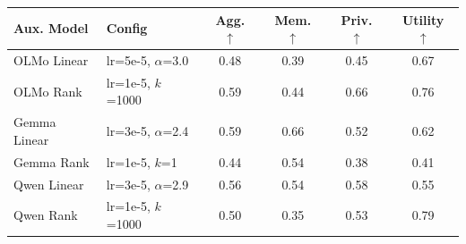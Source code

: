 \begin{tabular}{llcccc}
\toprule
Aux. Model & Config & Agg. $\uparrow$ & Mem. $\uparrow$ & Priv. $\uparrow$ & Utility $\uparrow$ \\
\midrule
OLMo Linear & lr=5e-5, $\alpha$=3.0 & 0.48 & 0.39 & 0.45 & 0.67 \\
OLMo Rank & lr=1e-5, $k$=1000 & 0.59 & 0.44 & 0.66 & 0.76 \\
Gemma Linear & lr=3e-5, $\alpha$=2.4 & 0.59 & 0.66 & 0.52 & 0.62 \\
Gemma Rank & lr=1e-5, $k$=1 & 0.44 & 0.54 & 0.38 & 0.41 \\
Qwen Linear & lr=3e-5, $\alpha$=2.9 & 0.56 & 0.54 & 0.58 & 0.55 \\
Qwen Rank & lr=1e-5, $k$=1000 & 0.50 & 0.35 & 0.53 & 0.79 \\
\bottomrule
\end{tabular}
